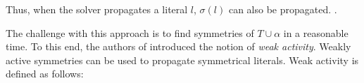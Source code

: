 	Thus, when the solver propagates a literal $l$, $\sigma(l)$ can also be propagated.
	.

	The challenge with this approach is to find symmetries of $T \cup \alpha$ in a
	reasonable time.
	To this end, the authors of \cite{devriendt2012symmetry} introduced the notion of
	\emph{weak activity}.
	Weakly active symmetries can be used to propagate symmetrical literals.
	Weak activity is defined as follows:\\

	\begin{definition}
		\todoi{\ldots}
	\end{definition}


